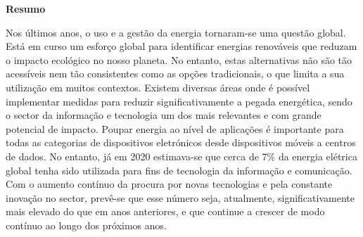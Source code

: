 \vspace*{2cm}
\begin{center}
\Large \bf Resumo
\end{center}
\vspace*{1cm} \setlength{\baselineskip}{0.6cm}

Nos últimos anos, o uso e a gestão da energia tornaram-se uma questão global. Está em curso um esforço global para identificar energias renováveis que reduzam o impacto ecológico no nosso planeta. No entanto, estas alternativas não são tão acessíveis nem tão consistentes como as opções tradicionais, o que limita a sua utilização em muitos contextos. Existem diversas áreas onde é possível implementar medidas para reduzir significativamente a pegada energética, sendo o sector da informação e tecnologia um dos mais relevantes e com grande potencial de impacto.
Poupar energia ao nível de aplicações é importante para todas as categorias de dispositivos eletrónicos desde dispositivos móveis a centros de dados. No entanto, já em 2020 estimava-se que cerca de 7\% da energia elétrica global tenha sido utilizada para fins de tecnologia da informação e comunicação. Com o aumento contínuo da procura por novas tecnologias e pela constante inovação no sector, prevê-se que esse número seja, atualmente, significativamente mais elevado do que em anos anteriores, e que continue a crescer de modo contínuo ao longo dos próximos anos.

